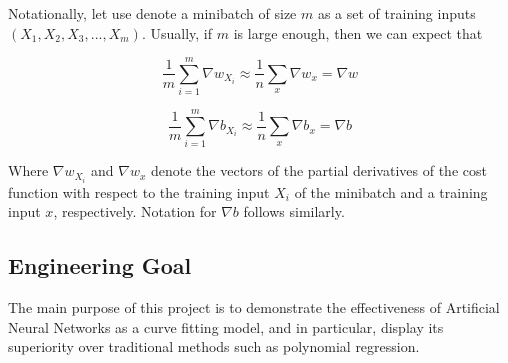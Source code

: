 \documentclass{article}
\begin{document}
Notationally, let use denote a minibatch of size $m$ as a set of training inputs $(X_1, X_2, X_3, ..., X_m)$. Usually, if $m$ is large enough, then we can expect that

\large
\begin{equation}
    \frac{1}{m} \sum_{i=1}^{m}{\nabla w_{X_i}} \approx \frac{1}{n} \sum_{x}{\nabla w_x} = \nabla w
\end{equation}

\begin{equation}
    \frac{1}{m} \sum_{i=1}^{m}{\nabla b_{X_i}} \approx \frac{1}{n} \sum_{x}{\nabla b_x } = \nabla b
\end{equation}
\normalsize

Where $\nabla w_{X_i}$ and $\nabla w_{x}$ denote the vectors of the partial derivatives of the cost function with respect to the training input $X_i$ of the minibatch and a training input $x$, respectively. Notation for $\nabla b$ follows similarly.



\subsection{Engineering Goal}
The main purpose of this project is to demonstrate the effectiveness of Artificial Neural Networks as a curve fitting model, and in particular, display its superiority over traditional methods such as polynomial regression.
\end{document}
